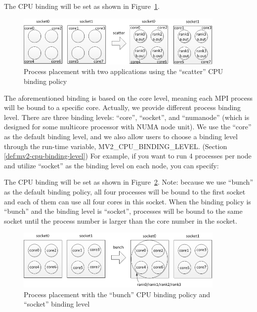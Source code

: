 

The CPU binding will be set as shown in Figure~\ref{fig:scatter2}.

\begin{figure}[htbp]
 \centering
 \includegraphics[width=0.9\textwidth]{Img/nehalem-scatter2.png}
 \caption{Process placement with two applications using the ``scatter'' CPU
			binding policy}
 \label{fig:scatter2}
\end{figure}

The aforementioned binding is based on the core level, meaning each MPI
process will be bound to a specific core. Actually, we provide different
process binding level. There are three binding levels: ``core'', ``socket'',
and ``numanode'' (which is designed for some multicore processor with NUMA
node unit). We use the ``core'' as the default binding level, and we
also allow users to choose a binding level through the run-time variable,
MV2\_CPU\_BINDING\_LEVEL. (Section \ref{def:mv2-cpu-binding-level})
For example, if you want to run 4 processes per node and utilize ``socket''
as the binding level on each node, you can specify:


The CPU binding will be set as shown in Figure~\ref{fig:socket_bunch}. Note:
because we use ``bunch'' as the default binding policy, all four processes will
be bound to the first socket and each of them can use all four cores in this
socket. When the binding policy is ``bunch'' and the binding level is
``socket'', processes will be bound to the same socket until the process number is
larger than the core number in the socket.

\begin{figure}[htbp]
 \centering
 \includegraphics[width=0.9\textwidth]{Img/nehalem-socket-bunch.png}
 \caption{Process placement with the ``bunch'' CPU binding policy and
``socket'' binding level}
 \label{fig:socket_bunch}
\end{figure}

